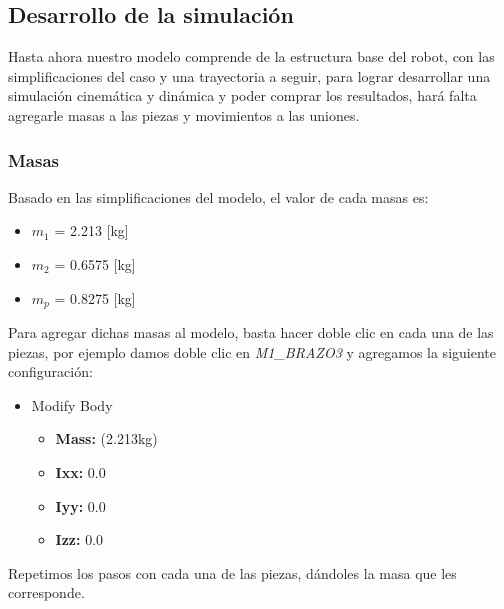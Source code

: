     \subsection{Desarrollo de la simulación}
    
    Hasta ahora nuestro modelo comprende de la estructura base del robot, con las simplificaciones del caso y una trayectoria a seguir, para lograr desarrollar una simulación cinemática y dinámica y poder comprar los resultados, hará falta agregarle masas a las piezas y movimientos a las uniones.
    
    
    \subsubsection{Masas}
    
    Basado en las simplificaciones del modelo, el valor de cada masas es:
    
    \begin{itemize}
        \item \textbf{$m_{1}$} = 2.213 [kg]
        \item \textbf{$m_{2}$} = 0.6575 [kg]
        \item \textbf{$m_{p}$} = 0.8275 [kg]
    \end{itemize}
    
    Para agregar dichas masas al modelo, basta hacer doble clic en cada una de las piezas, por ejemplo damos doble clic en \textit{M1\_BRAZO3} y agregamos la siguiente configuración:
    
    \begin{scope}
        \renewcommand{\labelitemi}{\blacklozenge}
        \renewcommand{\labelitemii}{\checkmark}
        \begin{itemize}
            \item Modify Body
            \begin{itemize}
                \item \textbf{Mass:} (2.213kg)
                \item \textbf{Ixx:} 0.0
                \item \textbf{Iyy:} 0.0
                \item \textbf{Izz:} 0.0
            \end{itemize}
        \end{itemize}
    \end{scope}
    
    Repetimos los pasos con cada una de las piezas, dándoles la masa que les corresponde.
    
